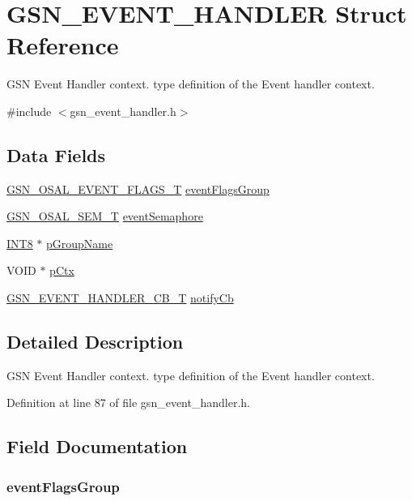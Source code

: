 \hypertarget{a00069}{
\section{GSN\_\-EVENT\_\-HANDLER Struct Reference}
\label{a00069}
}


GSN Event Handler context. type definition of the Event handler context.  




{\ttfamily \#include $<$gsn\_\-event\_\-handler.h$>$}

\subsection*{Data Fields}
\begin{DoxyCompactItemize}
\item 
\hyperlink{a00628_gab93fdfc637101a29260ca105d3eb924e}{GSN\_\-OSAL\_\-EVENT\_\-FLAGS\_\-T} \hyperlink{a00069_aca7c5b96452183add307fe2b2537e3f3}{eventFlagsGroup}
\item 
\hyperlink{a00628_gab4b3554407ce22b940e2fcd3faf5fd47}{GSN\_\-OSAL\_\-SEM\_\-T} \hyperlink{a00069_a7abbbe1ae05b5a78947c630ca20e3811}{eventSemaphore}
\item 
\hyperlink{a00660_ga307b8734c020247f6bac4fcde0dcfbb9}{INT8} $\ast$ \hyperlink{a00069_aff182528f0e0eb6c3aa245278125f1a0}{pGroupName}
\item 
VOID $\ast$ \hyperlink{a00069_a5ef049defd7cc5565bb3c81588802ef7}{pCtx}
\item 
\hyperlink{a00622_ga570a795e4730bcaa1c17b58223336526}{GSN\_\-EVENT\_\-HANDLER\_\-CB\_\-T} \hyperlink{a00069_aa0804abb73538a06693f8d7f8f01d51b}{notifyCb}
\end{DoxyCompactItemize}


\subsection{Detailed Description}
GSN Event Handler context. type definition of the Event handler context. 

Definition at line 87 of file gsn\_\-event\_\-handler.h.



\subsection{Field Documentation}
\hypertarget{a00069_aca7c5b96452183add307fe2b2537e3f3}{
\subsubsection[{eventFlagsGroup}]{ {\bf eventFlagsGroup}}}
\label{a00069_aca7c5b96452183add307fe2b2537e3f3}


